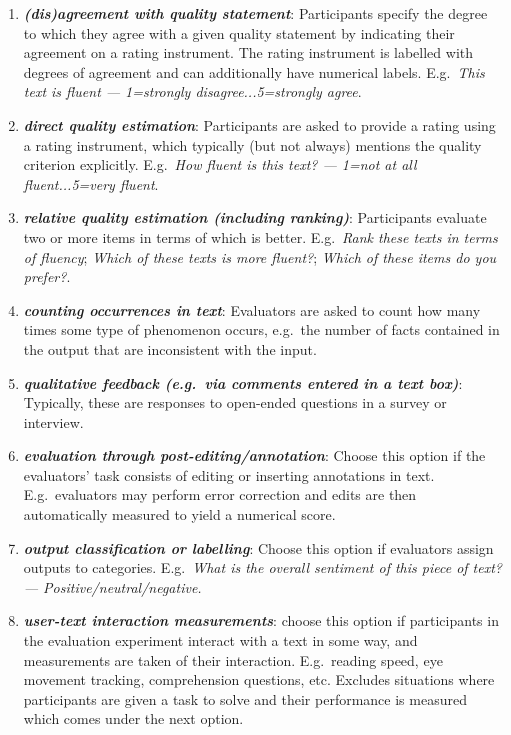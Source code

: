 \documentclass[11pt,a4paper]{article}
\newcommand{\egcvalue}[1]{\textbf{\textit{#1}}}
\begin{document}
\begin{enumerate}[itemsep=0cm,leftmargin=0.5cm,label={\LARGE $\circ$}]
    \item \egcvalue{(dis)agreement with quality statement}: Participants specify the degree to which they agree with a given quality statement by indicating their agreement on a rating instrument. The rating instrument is labelled with degrees of agreement and can additionally have numerical labels.  E.g.\ \textit{This text is fluent --- 1=strongly disagree...5=strongly agree}.
    \item \egcvalue{direct quality estimation}: Participants are asked to provide a rating using a rating instrument, which typically (but not always) mentions the quality criterion explicitly. E.g.\ \textit{How fluent is this text? --- 1=not at all fluent...5=very fluent}.
    \item \egcvalue{relative quality estimation (including ranking)}: Participants evaluate two or more items in terms of which is better.
    E.g.\ \textit{Rank these texts in terms of fluency}; \textit{Which of these texts is more fluent?}; \textit{Which of these items do you prefer?}.
    \item \egcvalue{counting occurrences in text}: Evaluators are asked to count how many times some type of phenomenon occurs, e.g.\ the number of facts contained in the output that are inconsistent with the input.
    \item \egcvalue{qualitative feedback (e.g.\ via comments entered in a text box)}: Typically, these are responses to open-ended questions in a survey or interview.
    \item \egcvalue{evaluation through post-editing/annotation}: Choose this option if the evaluators' task consists of editing or inserting annotations in text. E.g.\ evaluators may perform error correction and edits are then automatically measured to yield a numerical score.
    \item \egcvalue{output classification or labelling}: Choose this option if evaluators assign outputs to categories. E.g.\ \textit{What is the overall sentiment of this piece of text? --- Positive/neutral/negative.}
    \item \egcvalue{user-text interaction measurements}: choose this option if participants in the evaluation experiment interact with a text in some way, and measurements are taken of their interaction. E.g.\ reading speed, eye movement tracking, comprehension questions, etc. Excludes situations where participants are given a task to solve and their performance is measured which comes under the next option.

\end{enumerate}
\end{document}
